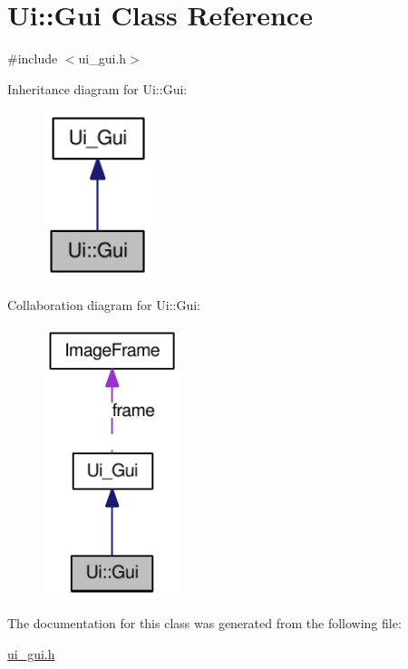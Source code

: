 \hypertarget{classUi_1_1Gui}{
\section{Ui::Gui Class Reference}
\label{classUi_1_1Gui}
}


{\ttfamily \#include $<$ui\_\-gui.h$>$}



Inheritance diagram for Ui::Gui:\nopagebreak
\begin{figure}[H]
\begin{center}
\leavevmode
\includegraphics[width=90pt]{classUi_1_1Gui__inherit__graph}
\end{center}
\end{figure}


Collaboration diagram for Ui::Gui:\nopagebreak
\begin{figure}[H]
\begin{center}
\leavevmode
\includegraphics[width=114pt]{classUi_1_1Gui__coll__graph}
\end{center}
\end{figure}


The documentation for this class was generated from the following file:\begin{DoxyCompactItemize}
\item 
\hyperlink{ui__gui_8h}{ui\_\-gui.h}\end{DoxyCompactItemize}
